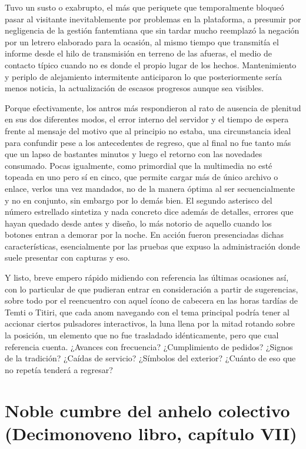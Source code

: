 \documentclass[
]{book}
\begin{document}
Tuvo un susto o exabrupto, el más que periquete que temporalmente bloqueó pasar al visitante inevitablemente por problemas en la plataforma, a presumir por negligencia de la gestión fantemtiana que sin tardar mucho reemplazó la negación por un letrero elaborado para la ocasión, al mismo tiempo que transmitía el informe desde el hilo de transmisión en terreno de las afueras, el medio de contacto típico cuando no es donde el propio lugar de los hechos. Mantenimiento y periplo de alejamiento intermitente anticiparon lo que posteriormente sería menos noticia, la actualización de escasos progresos aunque sea visibles.

Porque efectivamente, los antros más respondieron al rato de ausencia de plenitud en sus dos diferentes modos, el error interno del servidor y el tiempo de espera frente al mensaje del motivo que al principio no estaba, una circunstancia ideal para confundir pese a los antecedentes de regreso, que al final no fue tanto más que un lapso de bastantes minutos y luego el retorno con las novedades consumado. Pocas igualmente, como primordial que la multimedia no esté topeada en uno pero sí en cinco, que permite cargar más de único archivo o enlace, verlos una vez mandados, no de la manera óptima al ser secuencialmente y no en conjunto, sin embargo por lo demás bien. El segundo asterisco del número estrellado sintetiza y nada concreto dice además de detalles, errores que hayan quedado desde antes y diseño, lo más notorio de aquello cuando los botones entran a demorar por la noche. En acción fueron presenciadas dichas características, esencialmente por las pruebas que expuso la administración donde suele presentar con capturas y eso.

Y listo, breve empero rápido midiendo con referencia las últimas ocasiones así, con lo particular de que pudieran entrar en consideración a partir de sugerencias, sobre todo por el reencuentro con aquel ícono de cabecera en las horas tardías de Temti o Titiri, que cada anom navegando con el tema principal podría tener al accionar ciertos pulsadores interactivos, la luna llena por la mitad rotando sobre la posición, un elemento que no fue trasladado idénticamente, pero que cual referencia cuenta. ¿Avances con frecuencia? ¿Cumplimiento de pedidos? ¿Signos de la tradición? ¿Caídas de servicio? ¿Símbolos del exterior? ¿Cuánto de eso que no repetía tenderá a regresar?

\hypertarget{noble-cumbre-del-anhelo-colectivo-decimonoveno-libro-capuxedtulo-vii}{%
\section{Noble cumbre del anhelo colectivo (Decimonoveno libro, capítulo VII)}\label{noble-cumbre-del-anhelo-colectivo-decimonoveno-libro-capuxedtulo-vii}}
\end{document}
